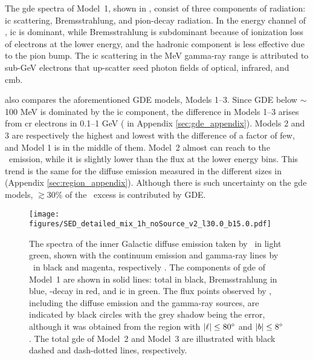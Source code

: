 \documentclass[a4paper,11pt]{article}
\begin{document}
The \ac{gde} spectra of Model~1, shown in , consist of three components of radiation: \ac{ic} scattering, Bremsstrahlung, and pion-decay radiation.
In the energy channel of \comptel, \ac{ic} is dominant, while Bremsstrahlung is subdominant because of ionization loss of electrons at the lower energy, and the hadronic component is less effective due to the pion bump.
The \ac{ic} scattering in the MeV gamma-ray range is attributed to sub-GeV electrons that up-scatter seed photon fields of optical, infrared, and \ac{cmb}.


 also compares the aforementioned GDE models, Models 1--3.
Since GDE below $\sim$100 MeV is dominated by the \ac{ic} component, the difference in Models 1--3 arises from \ac{cr} electrons in 0.1–1 GeV ( in Appendix \ref{sec:gde_appendix}).
Models 2 and 3 are respectively the highest and lowest with the difference of a factor of few, and Model 1 is in the middle of them.
Model~2 almost can reach to the \comptel\ emission, while it is slightly lower than the flux at the lower energy bins. This trend is the same for the diffuse emission measured in the different sizes in  (Appendix \ref{sec:region_appendix}).
Although there is such uncertainty on the \ac{gde} models, $\gtrsim$30\% of the \comptel\ excess is contributed by GDE.


\begin{figure}[ht!]
\centering
\texttt{[image: figures/SED\_detailed\_mix\_1h\_noSource\_v2\_l30.0\_b15.0.pdf]}
\caption{
The spectra of the inner Galactic diffuse emission taken by \comptel\ in light green, shown with the continuum emission and gamma-ray lines by \spi\ in black and magenta, respectively \citep{bouchet_diffuse_2011}.
The components of \ac{gde} of Model~1 \citep{ackermann_fermi_2012} are shown in solid lines: total in black, Bremsstrahlung in blue, \pizero -decay in red, and \ac{ic} in green. 
The flux points observed by \lat, including the diffuse emission and the gamma-ray sources, are indicated by black circles with the grey shadow being the error, although it was obtained from the region with $|\ell| \leq 80\hbox{$^\circ$}$ and $|b| \leq 8\hbox{$^\circ$}$ \citep{ackermann_fermi_2012}.
The total \ac{gde} of Model~2 and Model~3 are illustrated with black dashed and dash-dotted lines, respectively.
\label{fig:fig1}
}
\end{figure}

\fi
\end{document}
